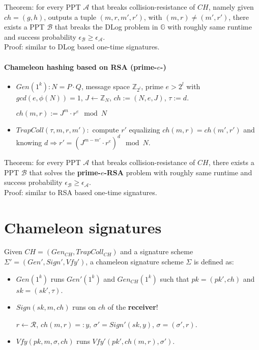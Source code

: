 \documentclass[oneside]{book}
\newcommand{\Z}[0]{\mathbb{Z}}
\newcommand{\G}[0]{\mathbb{G}}
\newcommand{\cA}[0]{\mathcal{A}}
\newcommand{\cB}[0]{\mathcal{B}}
\newcommand{\epsA}[0]{\epsilon_\cA}
\newcommand{\epsB}[0]{\epsilon_\cB}
\begin{document}
Theorem: for every PPT $\cA$ that breaks collision-resistance of $CH$, namely given $ch = (g,h)$, outputs a tuple $(m,r,m',r')$, with $(m,r) \neq (m',r')$, there exists a PPT $\cB$ that breaks the DLog problem in $\G$ with roughly same runtime and success probability $\epsB \ge \epsA$.\\

Proof: similar to DLog based one-time signatures.

\paragraph{Chameleon hashing based on RSA (prime-$e$-)}
\begin{itemize}
    \item $Gen(1^k): N = P \cdot Q$, message space $\Z_{2^l}$, prime $e > 2^l$ with $gcd(e, \phi(N)) = 1$, $J \leftarrow \Z_N$, $ch := (N,e,J)$, $\tau := d$.
    
    $ch(m,r) := J^m \cdot r^e \mod N$
    
    \item $TrapColl(\tau, m, r, m'): $ compute $r'$ equalizing $ch(m,r) = ch(m',r')$ and knowing $d \Rightarrow r' = (J^{m-m'}\cdot r^e)^d \mod N$.
\end{itemize}

Theorem: for every PPT $\cA$ that breaks collision-resistance of $CH$, there exists a PPT $\cB$ that solves the \textbf{prime-$e$-RSA} problem with roughly same runtime and success probability $\epsB \ge \epsA$.\\

Proof: similar to RSA based one-time signatures.

\section{Chameleon signatures}
Given $CH = (Gen_{CH}, TrapColl_{CH})$ and a signature scheme $\Sigma' = (Gen', Sign', Vfy')$, a chameleon signature scheme $\Sigma$ is defined as:
\begin{itemize}
    \item $Gen(1^k)$ runs $Gen'(1^k)$ and $Gen_{CH}(1^k)$ such that $pk = (pk', ch)$ and $sk = (sk', \tau)$.
    \item $Sign(sk, m, ch)$ runs on $ch$ of the \textbf{receiver}! 
    
    $r \leftarrow \mathcal{R}$, $ch(m,r) =: y$, $\sigma' = Sign'(sk, y)$, $\sigma = (\sigma', r)$.
    \item $Vfy(pk, m, \sigma, ch)$ runs $Vfy'(pk', ch(m,r), \sigma')$.
\end{itemize}
\end{document}
